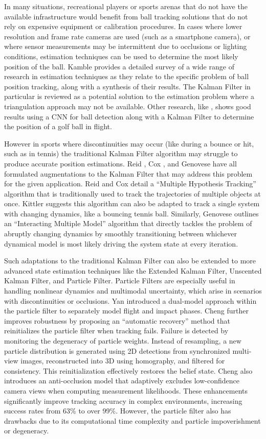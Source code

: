 \documentclass[conference]{IEEEtran}
\begin{document}
In many situations, recreational players or sports arenas that do not have the available infrastructure would benefit from ball tracking solutions that do not rely on expensive equipment or calibration procedures. In cases where lower resolution and frame rate cameras are used (such as a smartphone camera), or where sensor measurements may be intermittent due to occlusions or lighting conditions, estimation techniques can be used to determine the most likely position of the ball. Kamble \cite{b9} provides a detailed survey of a wide range of research in estimation techniques as they relate to the specific problem of ball position tracking, along with a synthesis of their results. The Kalman Filter in particular is reviewed as a potential solution to the estimation problem where a triangulation approach may not be available. Other research, like \cite{b10}, shows good results using a CNN for ball detection along with a Kalman Filter to determine the position of a golf ball in flight. 

However in sports where discontinuities may occur (like during a bounce or hit, such as in tennis) the traditional Kalman Filter algorithm may struggle to produce accurate position estimations. Reid \cite{b11}, Cox \cite{b12}, and Genovese \cite{b13} have all formulated augmentations to the Kalman Filter that may address this problem for the given application. Reid and Cox detail a “Multiple Hypothesis Tracking” algorithm that is traditionally used to track the trajectories of multiple objects at once. Kittler \cite{b14} suggests this algorithm can also be adapted to track a single system with changing dynamics, like a bouncing tennis ball. Similarly, Genovese outlines an “Interacting Multiple Model” algorithm that directly tackles the problem of abruptly changing dynamics by smoothly transitioning between whichever dynamical model is most likely driving the system state at every iteration.


Such adaptations to the traditional Kalman Filter can also be extended to more advanced state estimation techniques like the Extended Kalman Filter, Unscented Kalman Filter, and Particle Filter. Particle Filters are especially useful in handling nonlinear dynamics and multimodal uncertainty, which arise in scenarios with discontinuities or occlusions. Yan \cite{b15} introduced a dual-model approach within the particle filter to separately model flight and impact phases. Cheng \cite{b16} further improves robustness by proposing an “automatic recovery” method that reinitializes the particle filter when tracking fails. Failure is detected by monitoring the degeneracy of particle weights. Instead of resampling, a new particle distribution is generated using 2D detections from synchronized multi-view images, reconstructed into 3D using homography, and filtered for consistency. This reinitialization effectively restores the belief state. Cheng also introduces an anti-occlusion model that adaptively excludes low-confidence camera views when computing measurement likelihoods. These enhancements significantly improve tracking accuracy in complex environments, increasing success rates from 63\% to over 99\%. However, the particle filter also has drawbacks due to its computational time complexity and particle impoverishment or degeneracy. 
\end{document}
